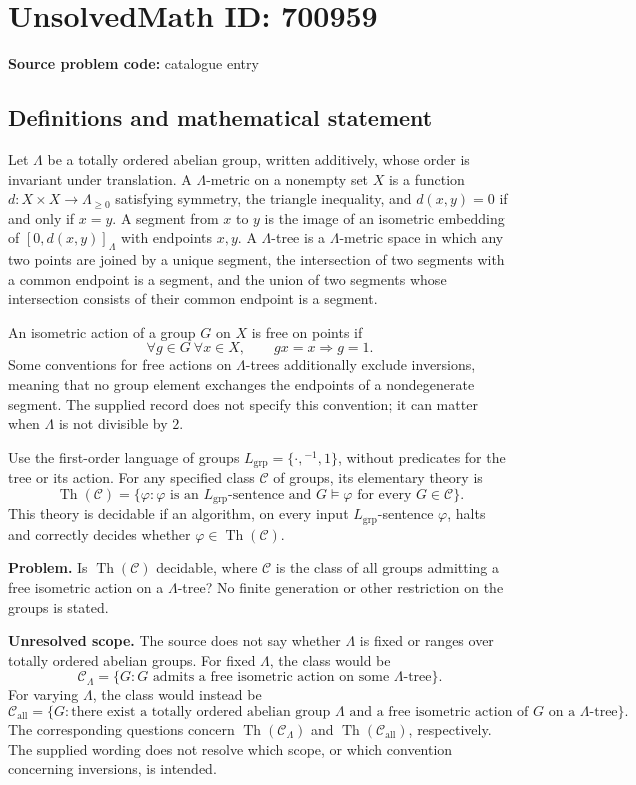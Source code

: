 \documentclass[11pt]{article}
\begin{document}
\section*{UnsolvedMath ID: 700959}
\textbf{Source problem code:} catalogue entry
\subsection{Definitions and mathematical statement}
Let \(\Lambda\) be a totally ordered abelian group, written additively, whose order is invariant under translation. A \(\Lambda\)-metric on a nonempty set \(X\) is a function \(d:X\times X\to\Lambda_{\geq 0}\) satisfying symmetry, the triangle inequality, and \(d(x,y)=0\) if and only if \(x=y\). A segment from \(x\) to \(y\) is the image of an isometric embedding of \([0,d(x,y)]_\Lambda\) with endpoints \(x,y\). A \(\Lambda\)-tree is a \(\Lambda\)-metric space in which any two points are joined by a unique segment, the intersection of two segments with a common endpoint is a segment, and the union of two segments whose intersection consists of their common endpoint is a segment.

An isometric action of a group \(G\) on \(X\) is free on points if
\[
\forall g\in G\ \forall x\in X,\qquad gx=x\Longrightarrow g=1.
\]
Some conventions for free actions on \(\Lambda\)-trees additionally exclude inversions, meaning that no group element exchanges the endpoints of a nondegenerate segment. The supplied record does not specify this convention; it can matter when \(\Lambda\) is not divisible by \(2\).

Use the first-order language of groups \(L_{\mathrm{grp}}=\{\cdot,{}^{-1},1\}\), without predicates for the tree or its action. For any specified class \(\mathcal C\) of groups, its elementary theory is
\[
\operatorname{Th}(\mathcal C)=\{\varphi:\varphi\text{ is an }L_{\mathrm{grp}}\text{-sentence and }G\models\varphi\text{ for every }G\in\mathcal C\}.
\]
This theory is decidable if an algorithm, on every input \(L_{\mathrm{grp}}\)-sentence \(\varphi\), halts and correctly decides whether \(\varphi\in\operatorname{Th}(\mathcal C)\).

\textbf{Problem.} Is \(\operatorname{Th}(\mathcal C)\) decidable, where \(\mathcal C\) is the class of all groups admitting a free isometric action on a \(\Lambda\)-tree? No finite generation or other restriction on the groups is stated.

\textbf{Unresolved scope.} The source does not say whether \(\Lambda\) is fixed or ranges over totally ordered abelian groups. For fixed \(\Lambda\), the class would be
\[
\mathcal C_\Lambda=\{G: G\text{ admits a free isometric action on some }\Lambda\text{-tree}\}.
\]
For varying \(\Lambda\), the class would instead be
\[
\mathcal C_{\mathrm{all}}=\{G:\text{there exist a totally ordered abelian group }\Lambda\text{ and a free isometric action of }G\text{ on a }\Lambda\text{-tree}\}.
\]
The corresponding questions concern \(\operatorname{Th}(\mathcal C_\Lambda)\) and \(\operatorname{Th}(\mathcal C_{\mathrm{all}})\), respectively. The supplied wording does not resolve which scope, or which convention concerning inversions, is intended.
\end{document}

